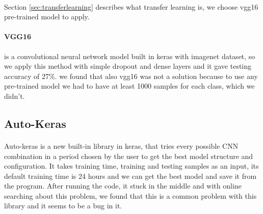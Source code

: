 \paragraph{}
Section \ref{sec:transferlearning} describes what transfer learning is, we choose vgg16 pre-trained model to apply.

\paragraph{VGG16}
is a convolutional neural network model built in keras with imagenet dataset, so we apply this method with simple dropout and dense layers and it gave testing accuracy of 27\%.
we found that also vgg16 was not a solution because to use any pre-trained model we had to have at least 1000 samples for each class, which we didn't.

\subsection{Auto-Keras}
\paragraph{}
Auto-keras is a new built-in library in keras, that tries every possible CNN combination in a period chosen by the user to get the best model structure and configuration. It takes training time, training and testing samples as an input, its default training time is 24 hours and we can get the best model and save it from the program.
After running the code, it stuck in the middle and with online searching about this problem, we found that this is a common problem with this library and it seems to be a bug in it.
